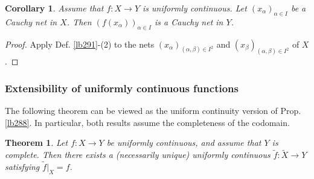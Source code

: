 \documentclass[12pt,b5paper,notitlepage]{article}
\theoremstyle{definition}
\theoremstyle{plain}
\newtheorem{thm}[df]{Theorem}
\newtheorem{co}[df]{Corollary}
\newcommand{\wtd}{\widetilde}
\numberwithin{equation}{section}
\begin{document}
\begin{co}\label{lb292}
Assume that $f:X\rightarrow Y$ is uniformly continuous. Let $(x_\alpha)_{\alpha\in I}$ be a Cauchy net in $X$. Then $(f(x_\alpha))_{\alpha\in I}$ is a Cauchy net in $Y$.
\end{co}

\begin{proof}
Apply Def. \ref{lb291}-(2) to the nets $(x_\alpha)_{(\alpha,\beta)\in I^2}$ and $(x_\beta)_{(\alpha,\beta)\in I^2}$ of $X$.
\end{proof}








\subsubsection{Extensibility of uniformly continuous functions}



The following theorem can be viewed as the uniform continuity version of Prop. \ref{lb288}. In particular, both results assume the completeness of the codomain.

\begin{thm}\label{lb297}
Let $f:X\rightarrow Y$ be uniformly continuous, and assume that $Y$ is complete. Then there exists a (necessarily unique) uniformly continuous $\wtd f:\wtd X\rightarrow Y$ satisfying $\wtd f|_X=f$.
\end{thm}
\end{document}
